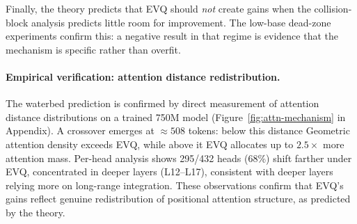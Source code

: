 Finally, the theory predicts that EVQ should \emph{not} create gains when the collision-block analysis predicts little room for improvement. The low-base dead-zone experiments confirm this: a negative result in that regime is evidence that the mechanism is specific rather than overfit.

\paragraph{Empirical verification: attention distance redistribution.}
The waterbed prediction is confirmed by direct measurement of attention distance distributions on a trained 750M model (Figure~\ref{fig:attn-mechanism} in Appendix). A crossover emerges at ${\approx}508$ tokens: below this distance Geometric attention density exceeds EVQ, while above it EVQ allocates up to $2.5\times$ more attention mass. Per-head analysis shows 295/432 heads (68\%) shift farther under EVQ, concentrated in deeper layers (L12--L17), consistent with deeper layers relying more on long-range integration. These observations confirm that EVQ's gains reflect genuine redistribution of positional attention structure, as predicted by the theory.
